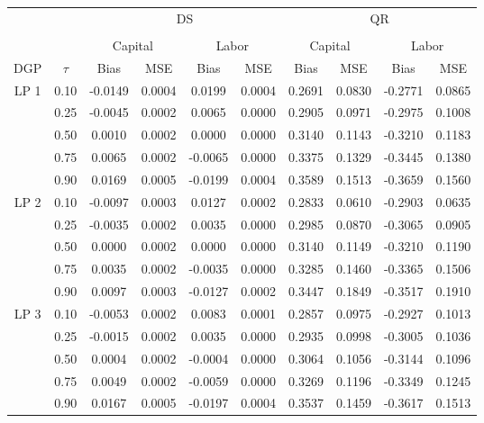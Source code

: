 \begin{table}[H]
\centering
\begin{tabular}{cccccccccc}
  \hline\hline & & & \multicolumn{2}{c}{DS} & & & \multicolumn{2}{c}{QR} \\ \cmidrule(lr){3-6} \cmidrule(lr){7-10} \\ & & \multicolumn{2}{c}{Capital} & \multicolumn{2}{c}{Labor} & \multicolumn{2}{c}{Capital} & \multicolumn{2}{c}{Labor} \\ \cmidrule(lr){3-4} \cmidrule(lr){5-6} \cmidrule(lr){7-8} \cmidrule(lr){9-10}DGP & $\tau$ & Bias & MSE & Bias & MSE & Bias & MSE & Bias & MSE \\ 
  \hline
LP 1 & 0.10 & -0.0149 & 0.0004 & 0.0199 & 0.0004 & 0.2691 & 0.0830 & -0.2771 & 0.0865 \\ 
   & 0.25 & -0.0045 & 0.0002 & 0.0065 & 0.0000 & 0.2905 & 0.0971 & -0.2975 & 0.1008 \\ 
   & 0.50 & 0.0010 & 0.0002 & 0.0000 & 0.0000 & 0.3140 & 0.1143 & -0.3210 & 0.1183 \\ 
   & 0.75 & 0.0065 & 0.0002 & -0.0065 & 0.0000 & 0.3375 & 0.1329 & -0.3445 & 0.1380 \\ 
   & 0.90 & 0.0169 & 0.0005 & -0.0199 & 0.0004 & 0.3589 & 0.1513 & -0.3659 & 0.1560 \\ 
  LP 2 & 0.10 & -0.0097 & 0.0003 & 0.0127 & 0.0002 & 0.2833 & 0.0610 & -0.2903 & 0.0635 \\ 
   & 0.25 & -0.0035 & 0.0002 & 0.0035 & 0.0000 & 0.2985 & 0.0870 & -0.3065 & 0.0905 \\ 
   & 0.50 & 0.0000 & 0.0002 & 0.0000 & 0.0000 & 0.3140 & 0.1149 & -0.3210 & 0.1190 \\ 
   & 0.75 & 0.0035 & 0.0002 & -0.0035 & 0.0000 & 0.3285 & 0.1460 & -0.3365 & 0.1506 \\ 
   & 0.90 & 0.0097 & 0.0003 & -0.0127 & 0.0002 & 0.3447 & 0.1849 & -0.3517 & 0.1910 \\ 
  LP 3 & 0.10 & -0.0053 & 0.0002 & 0.0083 & 0.0001 & 0.2857 & 0.0975 & -0.2927 & 0.1013 \\ 
   & 0.25 & -0.0015 & 0.0002 & 0.0035 & 0.0000 & 0.2935 & 0.0998 & -0.3005 & 0.1036 \\ 
   & 0.50 & 0.0004 & 0.0002 & -0.0004 & 0.0000 & 0.3064 & 0.1056 & -0.3144 & 0.1096 \\ 
   & 0.75 & 0.0049 & 0.0002 & -0.0059 & 0.0000 & 0.3269 & 0.1196 & -0.3349 & 0.1245 \\ 
   & 0.90 & 0.0167 & 0.0005 & -0.0197 & 0.0004 & 0.3537 & 0.1459 & -0.3617 & 0.1513 \\ 

\end{tabular}
\end{table}
